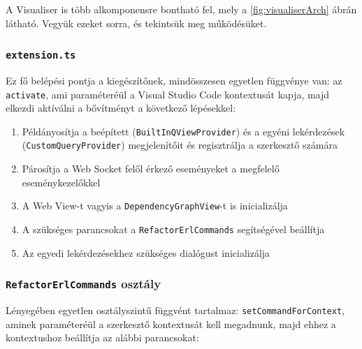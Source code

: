 A Visualiser is több alkomponensre bontható fel, mely a \ref{fig:visualiserArch} ábrán látható. Vegyük ezeket sorra, és tekintsük meg működésüket.

\subsubsection{\lstinline{extension.ts}}

Ez fő belépési pontja a kiegészítőnek, mindösszesen egyetlen függvénye van: az \lstinline{activate}, ami paraméteréül a Visual Studio Code kontextusát kapja, majd elkezdi aktíválni a bővítményt a következő lépésekkel:

\begin{enumerate}
    \item Példányosítja a beépített (\lstinline{BuiltInQViewProvider}) és a egyéni lekérdezések (\lstinline{CustomQueryProvider}) megjelenítőit és regisztrálja a szerkesztő számára
    \item Párosítja a Web Socket felől érkező eseményeket a megfelelő eseménykezelőkkel
    \item A Web View-t vagyis a \lstinline{DependencyGraphView}-t is inicializálja
    \item A szükséges parancsokat a \lstinline{RefactorErlCommands} segítségével beállítja
    \item Az egyedi lekérdezésekhez szükséges dialógust inicializálja
\end{enumerate}

\subsubsection{\lstinline{RefactorErlCommands} osztály}

Lényegében egyetlen osztályszintű függvént tartalmaz: \lstinline{setCommandForContext}, aminek paraméteréül a szerkesztő kontextusát kell megadnunk, majd ehhez a kontextushoz beállítja az alábbi parancsokat:

